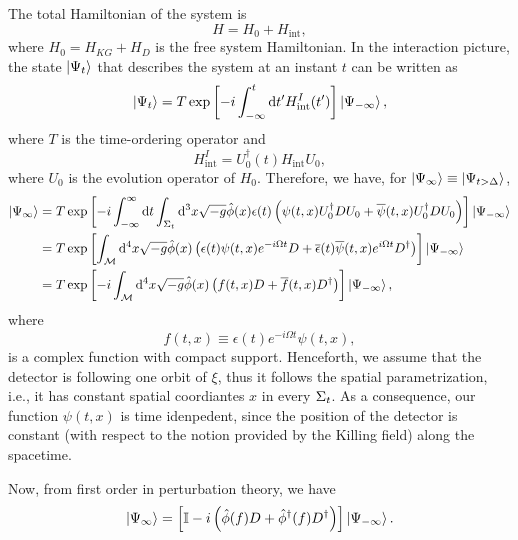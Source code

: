 The total Hamiltonian of the system is
\begin{equation}
    H=H_0+H_{\text{int}},
\end{equation}
where \(H_0=H_{KG}+H_D\) is the free system Hamiltonian. In the interaction picture, the state \(\ket{\Psi_t}\) that describes the system at an instant \(t\) can be written as
\begin{equation}
    \ket{\Psi_t}=T\exp{\left[-i\int_{-\infty}^t\mathrm{d}t'H_{\text{int}}^I(t')\right]}\ket{\Psi_{-\infty}},
\end{equation}
where \(T\) is the time-ordering operator and
\begin{equation}
    H_{\text{int}}^I=U_0^{\dagger}(t)H_{\text{int}}U_0,
\end{equation}
where \(U_0\) is the evolution operator of \(H_0\). Therefore, we have, for \(\ket{\Psi_{\infty}}\equiv\ket{\Psi_{t>\Delta}}\),
\begin{subequations}
    \begin{align}
        \ket{\Psi_\infty}&=T\exp{\left[-i\int_{-{\infty}}^{\infty}\mathrm{d}t\int_{\Sigma_t}\mathrm{d}^3x\sqrt{-g}\hat{\phi}(x)\epsilon(t)\left(\psi(t,x)U_0^{\dagger}DU_0+\overline{\psi}(t,x)U_0^{\dagger}DU_0\right)\right]}\ket{\Psi_{-\infty}}\\
        &=T\exp{\left[\int_{{\mathcal{M}}}\mathrm{d}^4x\sqrt{-g}\hat{\phi}(x)\left(\epsilon(t)\psi(t,x)e^{-i\Omega t}D+\overline{\epsilon}(t)\overline{\psi}(t,x)e^{i\Omega t}D^{\dagger}\right)\right]}\ket{\Psi_{-\infty}}\\
        &=T\exp{\left[-i\int_{\mathcal{M}}\mathrm{d}^4x\sqrt{-g}\hat{\phi}(x)\left(f(t,x)D+\overline{f}(t,x)D^{\dagger}\right)\right]}\ket{\Psi_{-\infty}},
    \end{align}
\end{subequations}
where
\begin{equation}
    f(t,x)\equiv\epsilon(t)e^{-i\Omega t}\psi(t,x),
\end{equation}
is a complex function with compact support. Henceforth, we assume that the detector is following one orbit of \(\xi\), thus it follows the spatial parametrization, i.e., it has constant spatial coordiantes \(x\) in every \(\Sigma_t\). As a consequence, our function \(\psi(t,x)\) is time idenpedent, since the position of the detector is constant (with respect to the notion provided by the Killing field) along the spacetime.

Now, from first order in perturbation theory, we have
\begin{equation}\label{eq:psi-infinity}
    \ket{\Psi_{\infty}}=\left[{\mathbb{I}}-i\left(\hat{\phi}(f)D+\hat{\phi}^{\dagger}(f)D^{\dagger}\right)\right]\ket{\Psi_{-\infty}}.
\end{equation}

